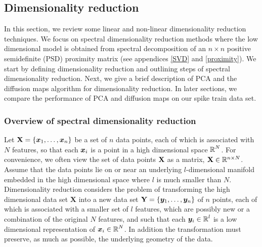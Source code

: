 
\subsection{Dimensionality reduction}\label{spectral decomp}
In this section, we review some linear and non-linear dimensionality reduction techniques. We focus on spectral dimensionality reduction methods where the low dimensional model is obtained from spectral decomposition of an $n \times n$ positive semidefinite (PSD) proximity matrix (see appendices \ref{SVD} and \ref{proximity}). We start by defining dimensionality reduction and outlining steps of spectral dimensionality reduction. Next, we give a brief description of PCA and the diffusion maps algorithm for dimensionality reduction. In later sections, we compare the performance of PCA and diffusion maps on our spike train data set.


\subsubsection{Overview of spectral dimensionality reduction}
Let $\textbf{X} = \displaystyle \{\boldsymbol{x}_{1}, \ldots , \boldsymbol{x}_{n} \}$ be a set of $n$ data points, each of which is associated with $N$ features, so that each $\boldsymbol{x}_{i}$ is a point in a high dimensional space $\operatorname{\mathbb{R}}^{N}$. For convenience, we often view the set of data points $\textbf{X}$ as a matrix, $\textbf{X} \in \mathbb{R}^{n \times N}$. Assume that the data points lie on or near an underlying $l$-dimensional manifold embedded in the high dimensional space where $l$ is much smaller than $N$. Dimensionality reduction considers the problem of  transforming the high dimensional data set $\textbf{X}$ into a new data set $\textbf{Y} = \displaystyle \{ \boldsymbol{y}_{1}, \ldots, \boldsymbol{y}_{n} \}$  of $n$ points, each of which is associated with a smaller set of $l$ features, which are possibly new or a combination of the original $N$ features, and such that each $\boldsymbol{y}_{i} \in \operatorname{\mathbb{R}}^{l}$ is a low dimensional representation of $\boldsymbol{x}_{i} \in \operatorname{\mathbb{R}}^{N}$. In addition the transformation must preserve, as much as possible, the underlying geometry of the data.\\

